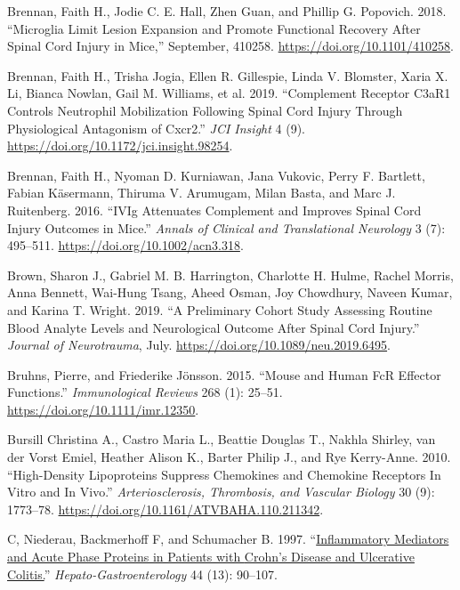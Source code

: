 \documentclass[9pt,lineno]{elife}
\newlength{\cslhangindent}
\newlength{\cslentryspacingunit} %
\newenvironment{CSLReferences}[2] %
 {%
  \setlength{\parindent}{0pt}
  \ifodd #1
  \let\oldpar\par
  \def\par{\hangindent=\cslhangindent\oldpar}
  \fi
  \setlength{\parskip}{#2\cslentryspacingunit}
 }%
 {}
\begin{document}
\begin{landscape}
\begin{landscape}
\begin{landscape}
\begin{landscape}
\begin{CSLReferences}{1}{0}
\leavevmode{}%
Brennan, Faith H., Jodie C. E. Hall, Zhen Guan, and Phillip G. Popovich. 2018. {``Microglia Limit Lesion Expansion and Promote Functional Recovery After Spinal Cord Injury in Mice,''} September, 410258. \url{https://doi.org/10.1101/410258}.

\leavevmode{}%
Brennan, Faith H., Trisha Jogia, Ellen R. Gillespie, Linda V. Blomster, Xaria X. Li, Bianca Nowlan, Gail M. Williams, et al. 2019. {``Complement Receptor {C3aR1} Controls Neutrophil Mobilization Following Spinal Cord Injury Through Physiological Antagonism of {Cxcr2}.''} \emph{JCI Insight} 4 (9). \url{https://doi.org/10.1172/jci.insight.98254}.

\leavevmode{}%
Brennan, Faith H., Nyoman D. Kurniawan, Jana Vukovic, Perry F. Bartlett, Fabian Käsermann, Thiruma V. Arumugam, Milan Basta, and Marc J. Ruitenberg. 2016. {``{IVIg} Attenuates Complement and Improves Spinal Cord Injury Outcomes in Mice.''} \emph{Annals of Clinical and Translational Neurology} 3 (7): 495--511. \url{https://doi.org/10.1002/acn3.318}.

\leavevmode{}%
Brown, Sharon J., Gabriel M. B. Harrington, Charlotte H. Hulme, Rachel Morris, Anna Bennett, Wai-Hung Tsang, Aheed Osman, Joy Chowdhury, Naveen Kumar, and Karina T. Wright. 2019. {``A Preliminary Cohort Study Assessing Routine Blood Analyte Levels and Neurological Outcome After Spinal Cord Injury.''} \emph{Journal of Neurotrauma}, July. \url{https://doi.org/10.1089/neu.2019.6495}.

\leavevmode{}%
Bruhns, Pierre, and Friederike Jönsson. 2015. {``Mouse and Human {FcR} Effector Functions.''} \emph{Immunological Reviews} 268 (1): 25--51. \url{https://doi.org/10.1111/imr.12350}.

\leavevmode{}%
Bursill Christina A., Castro Maria L., Beattie Douglas T., Nakhla Shirley, van der Vorst Emiel, Heather Alison K., Barter Philip J., and Rye Kerry-Anne. 2010. {``High-{Density Lipoproteins Suppress Chemokines} and {Chemokine Receptors In Vitro} and {In Vivo}.''} \emph{Arteriosclerosis, Thrombosis, and Vascular Biology} 30 (9): 1773--78. \url{https://doi.org/10.1161/ATVBAHA.110.211342}.

\leavevmode{}%
C, Niederau, Backmerhoff F, and Schumacher B. 1997. {``\href{https://www.ncbi.nlm.nih.gov/pubmed/9058126}{Inflammatory Mediators and Acute Phase Proteins in Patients with {Crohn}'s Disease and Ulcerative Colitis.}''} \emph{Hepato-Gastroenterology} 44 (13): 90--107.


\end{CSLReferences}
\end{landscape}
\end{landscape}
\end{landscape}
\end{landscape}
\end{document}
